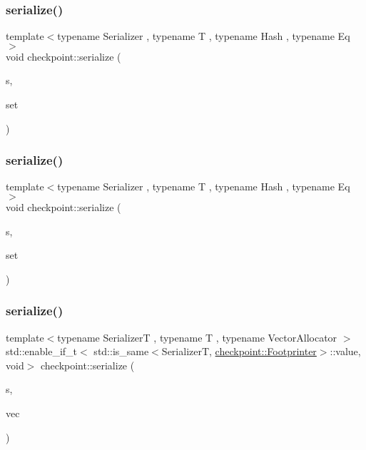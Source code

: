 \subsubsection{\texorpdfstring{serialize()}{serialize()}\hspace{0.1cm}{\footnotesize\ttfamily [27/30]}}
{\footnotesize\ttfamily template$<$typename Serializer , typename T , typename Hash , typename Eq $>$ \\
void checkpoint\+::serialize (\begin{DoxyParamCaption}\item[{Serializer \&}]{s,  }\item[{std\+::unordered\+\_\+set$<$ T, Hash, Eq $>$ \&}]{set }\end{DoxyParamCaption})\hspace{0.3cm}{\ttfamily [inline]}}

\mbox{\label{namespacecheckpoint_a64c8a1aa29d469bc71c88a8836264ecc}} 
\subsubsection{\texorpdfstring{serialize()}{serialize()}\hspace{0.1cm}{\footnotesize\ttfamily [28/30]}}
{\footnotesize\ttfamily template$<$typename Serializer , typename T , typename Hash , typename Eq $>$ \\
void checkpoint\+::serialize (\begin{DoxyParamCaption}\item[{Serializer \&}]{s,  }\item[{std\+::unordered\+\_\+multiset$<$ T, Hash, Eq $>$ \&}]{set }\end{DoxyParamCaption})\hspace{0.3cm}{\ttfamily [inline]}}

\mbox{\label{namespacecheckpoint_a3f43839a02cd77538b0d2f4192e926be}} 
\subsubsection{\texorpdfstring{serialize()}{serialize()}\hspace{0.1cm}{\footnotesize\ttfamily [29/30]}}
{\footnotesize\ttfamily template$<$typename SerializerT , typename T , typename Vector\+Allocator $>$ \\
std\+::enable\+\_\+if\+\_\+t$<$ std\+::is\+\_\+same$<$SerializerT, \hyperlink{structcheckpoint_1_1_footprinter}{checkpoint\+::\+Footprinter}$>$\+::value, void$>$ checkpoint\+::serialize (\begin{DoxyParamCaption}\item[{SerializerT \&}]{s,  }\item[{std\+::vector$<$ T, Vector\+Allocator $>$ \&}]{vec }\end{DoxyParamCaption})}

